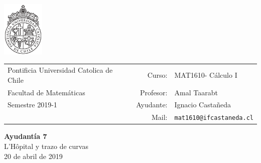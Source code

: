 \documentclass[12pt]{article}
\makeatletter
\newcommand{\ayudantia}{{\sc Ayudantía 7}}
\newcommand{\tituloayu}{L'Hôpital y trazo de curvas}
\newcommand{\fecha}{20 de abril de 2019}
\newcommand{\sigla}{MAT1610}
\newcommand{\nombre}{Cálculo I}
\newcommand{\profesor}{Amal Taarabt}
\newcommand{\ano}{2019}
\newcommand{\semestre}{1}
\newcommand{\mail}{mat1610@ifcastaneda.cl}
\makeatother
\begin{document}
\thispagestyle{empty}

\begin{minipage}{2cm}
	\includegraphics[width=2cm]{../../../../img/logo.pdf}
	\vspace{0.5cm}
\end{minipage}
\begin{minipage}{\linewidth}
	\begin{tabular}{lrl}
		{\scriptsize\sc Pontificia Universidad Catolica de Chile} & \hspace*{0.7in}Curso: &
		\sigla  - \nombre\\
		{\sc Facultad de Matemáticas}&
		Profesor: & \profesor \\
		{\sc Semestre \ano-\semestre} & Ayudante: & {Ignacio Castañeda}\\
		& {Mail:} & \texttt{\mail}
	\end{tabular}
\end{minipage}

\vspace{-10mm}
\begin{center}
	{\LARGE\bf \ayudantia}\\
	\vspace{0.1cm}
	{\tituloayu}\\
	\vspace{0.1cm}
	\fecha\\
	\vspace{0.4cm}
\end{center}
\end{document}
